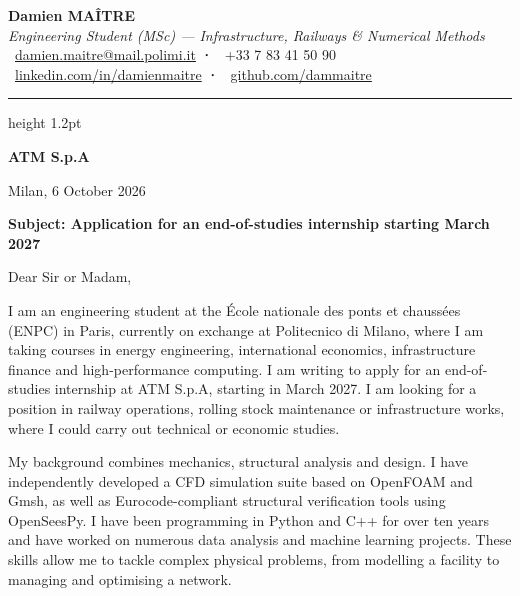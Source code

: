 \documentclass[a4paper,11pt]{extarticle}
\newcommand{\company}{ATM S.p.A}
\begin{document}
\begin{center}
  {\LARGE\bfseries\color{accent} Damien MAÎTRE}\\[2pt]
  {\normalsize\textit{\textcolor{muted}{Engineering Student (MSc) — Infrastructure, Railways \& Numerical Methods}}}\\[4pt]
  \small
  \textcolor{muted}{
    \faEnvelope\ \href{mailto:damien.maitre@mail.polimi.it}{damien.maitre@mail.polimi.it}
    \quad\textbf{·}\quad
    \faPhone\ +33 7 83 41 50 90
    \\[1pt]
    \faLinkedin\ \href{https://linkedin.com/in/damienmaitre}{linkedin.com/in/damienmaitre}
    \quad\textbf{·}\quad
    \faGithub\ \href{https://github.com/dammaitre}{github.com/dammaitre}
  }
\end{center}

\vspace{2pt}
{\color{accent}\hrule height 1.2pt}
\vspace{10pt}

\begin{flushright}
  \textbf{\company}\\
\end{flushright}

\vspace{4pt}
Milan, 6 October 2026

\vspace{4pt}
{\color{accent}\textbf{Subject: Application for an end-of-studies internship starting March 2027}}

\vspace{4pt}
Dear Sir or Madam,

I am an engineering student at the École nationale des ponts et chaussées (ENPC) in Paris, currently on exchange at Politecnico di Milano, where I am taking courses in energy engineering, international economics, infrastructure finance and high-performance computing. I am writing to apply for an end-of-studies internship at \company{}, starting in March 2027. I am looking for a position in railway operations, rolling stock maintenance or infrastructure works, where I could carry out technical or economic studies.

My background combines mechanics, structural analysis and design. I have independently developed a CFD simulation suite based on OpenFOAM and Gmsh, as well as Eurocode-compliant structural verification tools using OpenSeesPy. I have been programming in Python and C++ for over ten years and have worked on numerous data analysis and machine learning projects. These skills allow me to tackle complex physical problems, from modelling a facility to managing and optimising a network.
\end{document}
